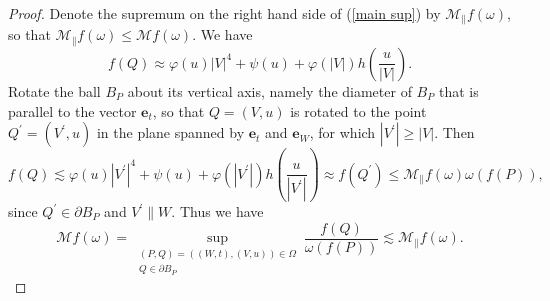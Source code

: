 \documentclass{amsart}
\theoremstyle{plain}
\numberwithin{equation}{section}
\begin{document}
\begin{proof}
Denote the supremum on the right hand side of (\ref{main sup}) by $\mathcal{M%
}_{\parallel }f\left( \omega \right) $, so that $\mathcal{M}_{\parallel
}f\left( \omega \right) \leq \mathcal{M}f\left( \omega \right) $. We have 
\begin{equation*}
f\left( Q\right) \approx \varphi \left( u\right) \left\vert V\right\vert
^{4}+\psi \left( u\right) +\varphi \left( \left\vert V\right\vert \right)
h\left( \frac{u}{\left\vert V\right\vert }\right) .
\end{equation*}%
Rotate the ball $B_{P}$ about its vertical axis, namely the diameter of $%
B_{P}$ that is parallel to the vector $\mathbf{e}_{t}$, so that $Q=\left(
V,u\right) $ is rotated to the point $Q^{\prime }=\left( V^{\prime
},u\right) $ in the plane spanned by $\mathbf{e}_{t}$ and $\mathbf{e}_{W}$,
for which $\left\vert V^{\prime }\right\vert \geq \left\vert V\right\vert $.
Then%
\begin{equation*}
f\left( Q\right) \lesssim \varphi \left( u\right) \left\vert V^{\prime
}\right\vert ^{4}+\psi \left( u\right) +\varphi \left( \left\vert V^{\prime
}\right\vert \right) h\left( \frac{u}{\left\vert V^{\prime }\right\vert }%
\right) \approx f\left( Q^{\prime }\right) \leq \mathcal{M}_{\parallel
}f\left( \omega \right) \omega \left( f\left( P\right) \right) ,
\end{equation*}%
since $Q^{\prime }\in \partial B_{P}$ and $V^{\prime }\parallel W$. Thus we
have 
\begin{equation*}
\mathcal{M}f\left( \omega \right) =\sup_{\substack{ \left( P,Q\right)
=\left( \left( W,t\right) ,\left( V,u\right) \right) \in \Omega  \\ Q\in
\partial B_{P}}}\frac{f\left( Q\right) }{\omega \left( f\left( P\right)
\right) }\lesssim \mathcal{M}_{\parallel }f\left( \omega \right) .
\end{equation*}
\end{proof}
\end{document}

